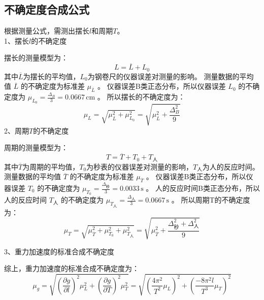 \documentclass[a4paper]{extarticle}
\begin{document}
    \subsection{不确定度合成公式}
    \hspace{2em}
    根据测量公式，需测出摆长$l$和周期$T$。\\
    1、摆长$l$的不确定度
    \par\hspace{2em}
    摆长的测量模型为：\\
    \begin{equation*}
        L=\overline{L}+L_0
    \end{equation*}
    其中$\overline{L}$为摆长的平均值，$L_0$为钢卷尺的仪器误差对测量的影响。
    测量数据的平均值 $\overline{L}$ 的不确定度为标准差 $\mu_{\overline{L}}$ 。
    仪器误差B类正态分布，所以仪器误差 $L_0$ 的不确定度为 $\mu_{L_0}=\frac{\Delta_B}{3}=0.0667\,\text{cm}$ 。
    所以摆长的不确定度为：
    \begin{equation*}
        \mu_L=\sqrt{\mu_{\overline{L}}^2+\mu_{L_0}^2}=\sqrt{\mu_{\overline{L}}^2+\frac{\Delta_B^2}{9}}
    \end{equation*}
    2、周期$T$的不确定度
    \par\hspace{2em}
    周期的测量模型为：\\
    \begin{equation*}
        T=\overline{T}+T_0+T_\text{人}
    \end{equation*}
    其中$\overline{T}$为周期的平均值，$T_0$为秒表的仪器误差对测量的影响，$T_\text{人}$为人的反应时间。
    测量数据的平均值 $\overline{T}$ 的不确定度为标准差 $\mu_{\overline{T}}$ 。
    仪器误差B类正态分布，所以仪器误差 $T_0$ 的不确定度为 $\mu_{T_0}=\frac{\Delta_\text{秒}}{3}=0.0033\,\text{s}$ 。
    人的反应时间B类正态分布，所以人的反应时间 $T_\text{人}$ 的不确定度为 $\mu_{T_\text{人}}=\frac{\Delta_\text{人}}{3}=0.0667\,\text{s}$ 。
    所以周期T的不确定度为：
    \begin{equation*}
        \mu_T=\sqrt{\mu_{\overline{T}}^2+\mu_{T_0}^2+\mu_{T_\text{人}}^2}=\sqrt{\mu_{\overline{T}}^2+\frac{\Delta_\text{秒}^2+\Delta_\text{人}^2}{9}}
    \end{equation*}
    \par
    3、重力加速度的标准合成不确定度
    \par
    \hspace{2em}
    综上，重力加速度的标准合成不确定度为：
    \begin{equation*}
        \mu_g=\sqrt{\left(\frac{\partial g}{\partial l}\right)^2\mu_L^2+\left(\frac{\partial g}{\partial T}\right)^2\mu_T^2}=\sqrt{\left(\frac{4\pi^2}{T^2}\mu_L\right)^2+\left(\frac{-8\pi^2l}{T^3}\mu_T\right)^2}
    \end{equation*}
\end{document}
